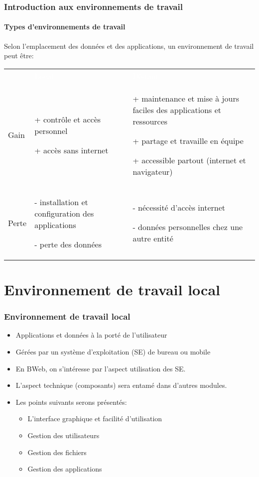 \documentclass[xcolor=table]{beamer}
\begin{document}
\begin{frame}
\frametitle{Introduction aux environnements de travail}
\framesubtitle{Types d'environnements de travail}

Selon l'emplacement des données et des applications, un environnement de travail peut être: 


\begin{tabular}{p{}p{}p{}}
	\rowcolor{darkblue}
	& \textcolor{white}{Local} & \textcolor{white}{Distant} \\
	
	Gain &
	+ contrôle et accès personnel 
	
	+ accès sans internet

	 & 
	+ maintenance et mise à jours faciles des applications et ressources
	
	+ partage et travaille en équipe
	
	+ accessible partout (internet et navigateur)
	 \\
	
	Perte &
	- installation et configuration des applications
	
	- perte des données
	&
	- nécessité d'accès internet
	
	- données personnelles chez une autre entité 
	\\
\end{tabular}

\end{frame}

\section{Environnement de travail local}

\begin{frame}
\frametitle{Environnement de travail local}

\begin{itemize}
	\item Applications et données à la porté de l'utilisateur 
	\item Gérées par un système d'exploitation (SE) de bureau ou mobile 
	\item En BWeb, on s'intéresse par l'aspect utilisation des SE. 
	\item L'aspect technique (composants) sera entamé dans d'autres modules. 
	\item Les points suivants serons présentés:
	\begin{itemize}
		\item L'interface graphique et facilité d'utilisation 
		\item Gestion des utilisateurs
		\item Gestion des fichiers
		\item Gestion des applications
	\end{itemize}
	
\end{itemize}

\end{frame}
\end{document}
